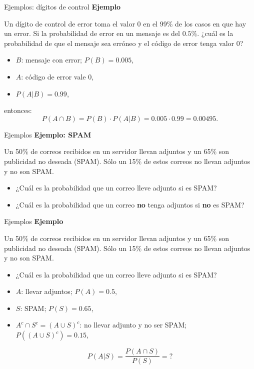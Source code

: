 \documentclass[
  ignorenonframetext,
]{beamer}
\providecommand{\tightlist}{%
  \setlength{\itemsep}{0pt}\setlength{\parskip}{0pt}}
\begin{document}
\begin{frame}{Ejemplos: dígitos de control}
\protect\hypertarget{ejemplos-duxedgitos-de-control}{}
\textbf{Ejemplo}

Un dígito de control de error toma el valor 0 en el 99\% de los casos en
que hay un error. Si la probabilidad de error en un mensaje es del
\(0.5\%\). ¿cuál es la probabilidad de que el mensaje sea erróneo y el
código de error tenga valor 0?

\begin{itemize}
\tightlist
\item
  \(B\): mensaje con error; \(P(B)=0.005\),
\item
  \(A\): código de error vale 0,
\item
  \(P(A|B)=0.99\),
\end{itemize}

entonces: \[P(A\cap B)=P(B)\cdot P(A|B)=0.005\cdot 0.99=0.00495.\]
\end{frame}

\begin{frame}{Ejemplos}
\protect\hypertarget{ejemplos-1}{}
\textbf{Ejemplo: SPAM}

Un 50\% de correos recibidos en un servidor llevan adjuntos y un 65\%
son publicidad no deseada (SPAM). Sólo un 15\% de estos correos no
llevan adjuntos y no son SPAM.

\begin{itemize}
\tightlist
\item
  ¿Cuál es la probabilidad que un correo lleve adjunto si es SPAM?
\item
  ¿Cuál es la probabilidad que un correo \textbf{no} tenga adjuntos si
  \textbf{no} es SPAM?
\end{itemize}
\end{frame}

\begin{frame}{Ejemplos}
\protect\hypertarget{ejemplos-2}{}
\textbf{Ejemplo}

Un 50\% de correos recibidos en un servidor llevan adjuntos y un 65\%
son publicidad no deseada (SPAM). Sólo un 15\% de estos correos no
llevan adjuntos y no son SPAM.

\begin{itemize}
\tightlist
\item
  ¿Cuál es la probabilidad que un correo lleve adjunto si es SPAM?
\end{itemize}

\begin{itemize}
\tightlist
\item
  \(A\): llevar adjuntos; \(P(A)=0.5\),
\item
  \(S\): SPAM; \(P(S)=0.65\),
\item
  \(A^c\cap S^c=(A\cup S)^c\): no llevar adjunto y no ser SPAM;
  \(P((A\cup S)^c)=0.15\),
\end{itemize}

\[P(A|S)=\dfrac{P(A\cap S)}{P(S)}=?\]
\end{frame}
\end{document}
